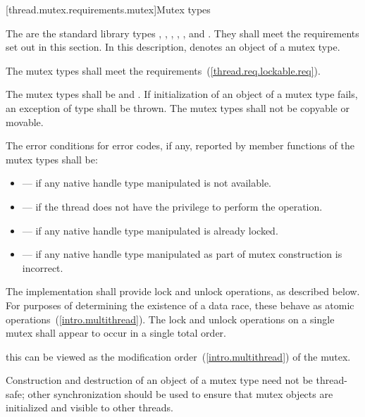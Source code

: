 [thread.mutex.requirements.mutex]{Mutex types}

\pnum
The  are the standard library types ,
, , ,
, and .
They shall meet the requirements set out in this section. In this description, 
denotes an object of a mutex type.

\pnum
The mutex types shall meet the  requirements~(\ref{thread.req.lockable.req}).

\pnum
The mutex types shall be  and . If
initialization of an object of a mutex type fails, an exception of type
 shall be thrown. The mutex types shall not be copyable or movable.

\pnum
The error conditions for error codes, if any, reported by member functions of the mutex types
shall be:
\begin{itemize}
\item {} --- if any native handle type manipulated is not available.
\item {} --- if the thread does not have the
privilege to perform the operation.
\item {} --- if any native handle type manipulated is already locked.
\item {} --- if any native handle type manipulated as part of mutex
construction is incorrect.
\end{itemize}

\pnum
The implementation shall provide lock and unlock operations, as described below.
For purposes of determining the existence of a data race, these behave as
atomic operations~(\ref{intro.multithread}). The lock and unlock operations on
a single mutex shall appear to occur in a single total order. \begin{note} this
can be viewed as the modification order~(\ref{intro.multithread}) of the
mutex. \end{note}
\begin{note} Construction and
destruction of an object of a mutex type need not be thread-safe; other
synchronization should be used to ensure that mutex objects are initialized
and visible to other threads. \end{note}

